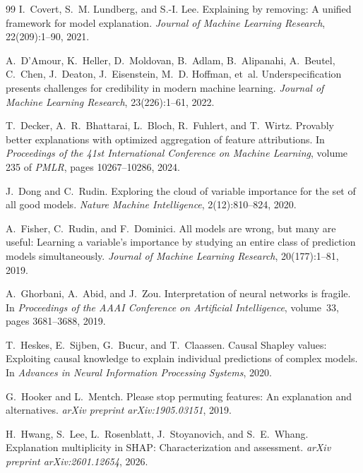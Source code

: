 \documentclass[11pt]{article}
\begin{document}
\begin{thebibliography}{99}
I.~Covert, S.~M. Lundberg, and S.-I. Lee.
\newblock Explaining by removing: A unified framework for model explanation.
\newblock \emph{Journal of Machine Learning Research}, 22(209):1--90, 2021.

A.~D'Amour, K.~Heller, D.~Moldovan, B.~Adlam, B.~Alipanahi, A.~Beutel,
  C.~Chen, J.~Deaton, J.~Eisenstein, M.~D. Hoffman, et~al.
\newblock Underspecification presents challenges for credibility in modern
  machine learning.
\newblock \emph{Journal of Machine Learning Research}, 23(226):1--61, 2022.

T.~Decker, A.~R.~Bhattarai, L.~Bloch, R.~Fuhlert, and T.~Wirtz.
\newblock Provably better explanations with optimized aggregation of feature
  attributions.
\newblock In \emph{Proceedings of the 41st International Conference on Machine
  Learning}, volume 235 of \emph{PMLR}, pages 10267--10286, 2024.

J.~Dong and C.~Rudin.
\newblock Exploring the cloud of variable importance for the set of all good
  models.
\newblock \emph{Nature Machine Intelligence}, 2(12):810--824, 2020.

A.~Fisher, C.~Rudin, and F.~Dominici.
\newblock All models are wrong, but many are useful: Learning a variable's
  importance by studying an entire class of prediction models simultaneously.
\newblock \emph{Journal of Machine Learning Research}, 20(177):1--81, 2019.

A.~Ghorbani, A.~Abid, and J.~Zou.
\newblock Interpretation of neural networks is fragile.
\newblock In \emph{Proceedings of the AAAI Conference on Artificial
  Intelligence}, volume~33, pages 3681--3688, 2019.

T.~Heskes, E.~Sijben, G.~Bucur, and T.~Claassen.
\newblock Causal {S}hapley values: Exploiting causal knowledge to explain
  individual predictions of complex models.
\newblock In \emph{Advances in Neural Information Processing Systems}, 2020.

G.~Hooker and L.~Mentch.
\newblock Please stop permuting features: An explanation and alternatives.
\newblock \emph{arXiv preprint arXiv:1905.03151}, 2019.

H.~Hwang, S.~Lee, L.~Rosenblatt, J.~Stoyanovich, and S.~E.~Whang.
\newblock Explanation multiplicity in {SHAP}: Characterization and assessment.
\newblock \emph{arXiv preprint arXiv:2601.12654}, 2026.


\end{thebibliography}
\end{document}

